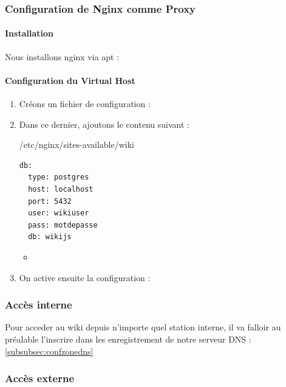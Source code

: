 \documentclass{article}
\begin{document}
\subsubsection{Configuration de Nginx comme Proxy}

\paragraph{Installation\\}
Nous installons nginx via apt :
\paragraph{Configuration du Virtual Host\\}

\begin{enumerate}
	\item Créons un fichier de configuration  :
	\item Dans ce dernier, ajoutons le contenu suivant :
\begin{configbox}{/etc/nginx/sites-available/wiki}
\begin{lstlisting}
db:
  type: postgres
  host: localhost
  port: 5432
  user: wikiuser
  pass: motdepasse
  db: wikijs
\end{lstlisting}
\end{configbox}
\begin{itemize}
	\item {}
\end{itemize}
	\item On active ensuite la configuration :
\end{enumerate}


\subsubsection{Accès interne}
Pour acceder au wiki depuis n'importe quel station interne, il va falloir au préalable l'inscrire dans les enregistrement de notre serveur DNS : \underline{\ref{subsubsec:confzonedns}}

\subsubsection{Accès externe}
\end{document}
